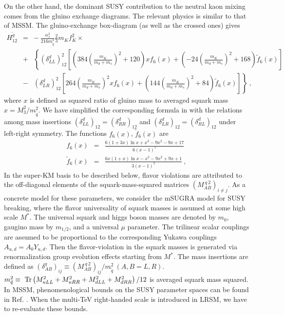 \documentclass[prd,aps,preprint,tightenlines,superscriptaddress]{revtex4}
\begin{document}
On the other hand, the dominant SUSY contribution to the neutral kaon mixing comes from the gluino
exchange diagrams. The relevant physics is similar to that of MSSM. The gluino-exchange box-diagram (as well as the crossed ones) gives
\begin{eqnarray}\label{gluinoH}
H_{12}^{\widetilde g} &=& -\ \frac{\alpha_s^2}{216 m_{\tilde{q}}^2} \frac{2}{3} m_{K}
f^2_{K} \times \nonumber \\
&+& \left\{ (\delta^d_{LL})^2_{12} \left[ \left( 384
\left( \frac{m_{K}}{m_d + m_s}\right)^2 + 120 \right) x f_6(x)
+ \left( -24 \left( \frac{m_{K}}{m_d + m_s}\right)^2 + 168
\right) \tilde{f}_6(x) \right] \right. \nonumber \\
&-& \left. (\delta^d_{LR})^2_{12} \left[ 264 \left( \frac{m_{K}}{m_d +
m_s}\right)^2 x f_6(x) + \left(  144
\left( \frac{m_{K}}{m_d + m_s}\right)^2 + 84 \right) \tilde{f}_6(x) \right]
\right\}\ ,
\end{eqnarray}
where $x$ is defined as squared ratio of gluino mass to averaged squark mass
$x=M_3^2/m_{\tilde{q}}^2$. We have simplified the corresponding formula in \cite{gluino} with the relations among mass insertions $(\delta^d_{LL})_{12}=(\delta^d_{RR})_{12}$ and $(\delta^d_{LR})_{12}=(\delta^d_{RL})_{12}$ under left-right symmetry. The functions $f_6(x)$, $\tilde{f}_6(x)$ are
\begin{eqnarray}
f_6(x) &=& \frac{6(1+3x)\ln x + x^3 - 9 x^2 - 9 x + 17 }{6(x-1)^5} \nonumber \\
\tilde{f}_6(x) &=& \frac{6x(1+x)\ln x - x^3 - 9 x^2 + 9 x + 1 }{3(x-1)^5} \ ,
\end{eqnarray}
In the super-KM basis to be described below, flavor violations are attributed to the off-diagonal elements of the squark-mass-squared matrices $\left( M^{~q~2}_{AB} \right)_{i\neq j}$.
As a concrete model for these parameters, we consider the mSUGRA model for SUSY breaking, 
where the flavor universality of squark masses is assumed at some high scale $M^*$. 
The universal squark and higgs boson masses are denoted by $m_0$, gaugino mass by $m_{1/2}$, and a universal $\mu$ parameter. The trilinear scalar couplings are assumed to be proportional to the corresponding Yukawa couplings $A_{u,d} = A_0 Y_{u,d}$. Then the flavor-violation in the squark masses is generated via renormalization group evolution effects starting from $M^*$.
The mass insertions are defined as $\left(\delta^q_{AB}\right)_{ij} \equiv
\left(M^{~q~2}_{AB}\right)_{ij} / m_{\widetilde q}^2\ (A,B=L,R)$. $m_{\tilde{q}}^2 \equiv {~\rm Tr} \left( M_{uLL}^2 + M_{uRR}^2 + M_{dLL}^2 + M_{dRR}^2 \right)/12$ is averaged squark mass squared. In MSSM, phenomenological bounds on the SUSY parameter spaces can be found in Ref. \cite{gluino, mssm}. When the multi-TeV right-handed scale is introduced in LRSM, we have to re-evaluate these bounds.
\end{document}
